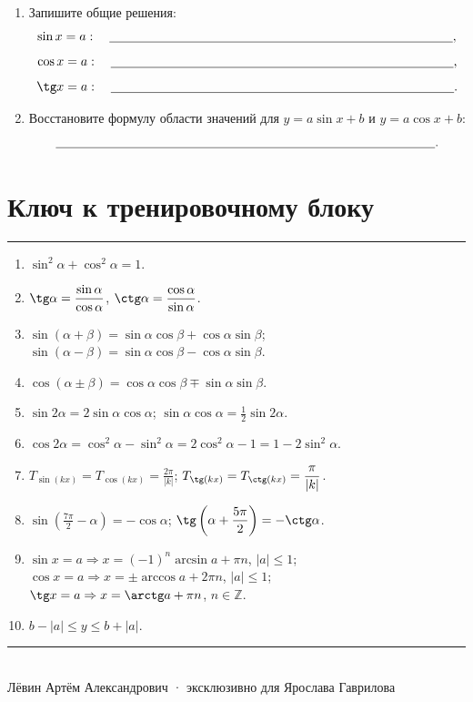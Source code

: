 \documentclass[a4paper,12pt]{article}
\newcommand{\sectionline}{\vspace{-1mm}\noindent\color{accent}\rule{\linewidth}{0.7pt}\color{textgray}\vspace{2mm}}
\newcommand{\Z}{\mathbb{Z}}
\begin{document}
\begin{enumerate}
  \item Запишите общие решения:
  \[
  \sin x=a:\quad \underline{\hspace{95mm}},
  \]
  \[
  \cos x=a:\quad \underline{\hspace{95mm}},
  \]
  \[
  \tg x=a:\quad \underline{\hspace{95mm}}.
  \]

  \item Восстановите формулу области значений для $y=a\sin x+b$ и $y=a\cos x+b$:
  \[
  \underline{\hspace{105mm}}.
  \]
\end{enumerate}

\clearpage
\section*{Ключ к тренировочному блоку}
\sectionline

\begin{enumerate}
  \item $\sin^2\alpha+\cos^2\alpha=1$.

  \item $\displaystyle\tg\alpha=\frac{\sin\alpha}{\cos\alpha}$, \quad
  $\displaystyle\ctg\alpha=\frac{\cos\alpha}{\sin\alpha}$.

  \item
  $\sin(\alpha+\beta)=\sin\alpha\cos\beta+\cos\alpha\sin\beta$;\\
  $\sin(\alpha-\beta)=\sin\alpha\cos\beta-\cos\alpha\sin\beta$.

  \item
  $\cos(\alpha\pm\beta)=\cos\alpha\cos\beta\mp\sin\alpha\sin\beta$.

  \item
  $\sin2\alpha=2\sin\alpha\cos\alpha$; \quad
  $\displaystyle\sin\alpha\cos\alpha=\frac12\sin2\alpha$.

  \item
  $\cos2\alpha=\cos^2\alpha-\sin^2\alpha=2\cos^2\alpha-1=1-2\sin^2\alpha$.

  \item
  $\displaystyle T_{\sin(kx)}=T_{\cos(kx)}=\frac{2\pi}{|k|}$; \quad
  $\displaystyle T_{\tg(kx)}=T_{\ctg(kx)}=\frac{\pi}{|k|}$.

  \item
  $\displaystyle\sin\left(\frac{7\pi}{2}-\alpha\right)=-\cos\alpha$; \quad
  $\displaystyle\tg\left(\alpha+\frac{5\pi}{2}\right)=-\ctg\alpha$.

  \item
  $\displaystyle\sin x=a\Rightarrow x=(-1)^n\arcsin a+\pi n$, $|a|\le1$;\\
  $\displaystyle\cos x=a\Rightarrow x=\pm\arccos a+2\pi n$, $|a|\le1$;\\
  $\displaystyle\tg x=a\Rightarrow x=\arctg a+\pi n$, \quad $n\in\Z$.

  \item $\boxed{b-|a|\le y\le b+|a|}$.
\end{enumerate}

\vfill
\begin{center}
{\color{accent}\rule{0.56\linewidth}{0.9pt}}\\[3mm]
{\small\color{softgray}Лёвин Артём Александрович · эксклюзивно для Ярослава Гаврилова}
\end{center}
\end{document}
